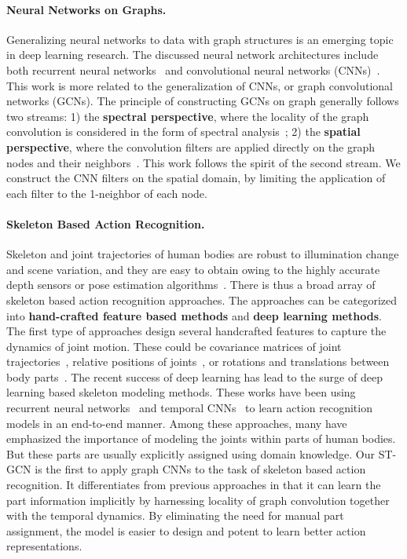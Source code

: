 \documentclass[letterpaper]{article} %
\begin{document}
\paragraph{Neural Networks on Graphs.}
Generalizing neural networks to data with graph structures is an emerging topic in deep learning research.
The discussed neural network architectures include both recurrent neural networks~\cite{Tai2015ACL,Van2016Pixel} and convolutional neural networks (CNNs)~\cite{Bruna2014ICLR,Henaff2015Arxiv,Duvenaud2015NIPS,Li2016ICLR,Defferrard2016NIPS}.
This work is more related to the generalization of CNNs, or graph convolutional networks (GCNs).
The principle of constructing GCNs on graph generally follows two streams: 1) the \textbf{spectral perspective}, where the locality of the graph convolution is considered in the form of spectral analysis~\cite{Henaff2015Arxiv,Duvenaud2015NIPS,Li2016ICLR,Kipf2017ICLR}; 2) the \textbf{spatial perspective}, where the convolution filters are applied directly on the graph nodes and their neighbors~\cite{Bruna2014ICLR,Niepert2016ICML}.
This work follows the spirit of the second stream. We construct the CNN filters on the spatial domain, by limiting the application of each filter to the 1-neighbor of each node.

\paragraph{Skeleton Based Action Recognition.}
Skeleton and joint trajectories of human bodies are robust to illumination change and scene variation, and they are easy to obtain owing to the highly accurate depth sensors or pose estimation algorithms~\cite{Shotton2013CVPR,Cao2017CVPR}. There is thus a broad array of skeleton based action recognition approaches.
The approaches can be categorized into \textbf{hand-crafted feature based methods} and \textbf{deep learning methods}.
The first type of approaches design several handcrafted features to capture the dynamics of joint motion. These could be covariance matrices of joint trajectories~\cite{Hussein2013IJCAI}, relative positions of joints~\cite{Wang2012CVPR}, or rotations and translations between body parts~\cite{Vemulapalli2014CVPR}.
The recent success of deep learning has lead to the surge of deep learning based skeleton modeling methods. These works have been using recurrent neural networks~\cite{Shahroudy2016CVPR,Zhu2016AAAI,Liu2016ECCV,Zhang2017WACV} and temporal CNNs~\cite{Li2017Skeleton,Ke2017CVPR,Kim2017CVPRW} to learn action recognition models in an end-to-end manner.
Among these approaches, many have emphasized the importance of modeling the joints within parts of human bodies.
But these parts are usually explicitly assigned using domain knowledge.
Our ST-GCN is the first to apply graph CNNs to the task of skeleton based action recognition. It differentiates from previous approaches in that it can learn the part information implicitly by harnessing locality of graph convolution together with the temporal dynamics.
By eliminating the need for manual part assignment, the model is easier to design and potent to learn better action representations.
\end{document}
